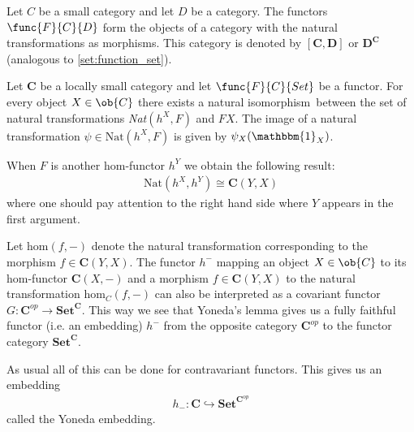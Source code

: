 	\begin{definition}
		Let $C$ be a small category and let $D$ be a category. The functors $\func{F}{C}{D}$ form the objects of a category with the natural transformations as morphisms. This category is denoted by $[\textbf{C}, \textbf{D}]$ or $\textbf{D}^{\textbf{C}}$ (analogous to \ref{set:function_set}).
	\end{definition}
	
	
	\begin{theorem}
		Let $\textbf{C}$ be a locally small category and let $\func{F}{C}{Set}$ be a functor. For every object $X\in\ob{C}$ there exists a natural isomorphism\footnotemark\ between the set of natural transformations \emph{Nat}$(h^X, F)$ and $FX$. The image of a natural transformation $\psi\in\text{Nat}(h^X, F)$ is given by $\psi_X(\mathbbm{1}_X)$.
	\end{theorem}

	\begin{result}
		When $F$ is another hom-functor $h^Y$ we obtain the following result:
		\begin{gather}
			\text{Nat}(h^X, h^Y)\cong\textbf{C}(Y, X)
		\end{gather}
		where one should pay attention to the right hand side where $Y$ appears in the first argument.
		
		Let $\text{hom}(f, -)$ denote the natural transformation corresponding to the morphism $f\in\textbf{C}(Y,X)$. The functor $h^-$ mapping an object $X\in\ob{C}$ to its hom-functor $\textbf{C}(X, -)$ and a morphism $f\in\textbf{C}(Y, X)$ to the natural transformation hom$_C(f, -)$ can also be interpreted as a covariant functor $G:\textbf{C}^{op}\rightarrow\textbf{Set}^{\textbf{C}}$. This way we see that Yoneda's lemma gives us a fully faithful functor (i.e. an embedding) $h^-$ from the opposite category $\textbf{C}^{op}$ to the functor category $\textbf{Set}^{\textbf{C}}$.
		
		As usual all of this can be done for contravariant functors. This gives us an embedding
		\begin{gather}
			h_-:\textbf{C}\hookrightarrow\textbf{Set}^{\textbf{C}^{op}}
		\end{gather}
		called the Yoneda embedding. 
	\end{result}
	
